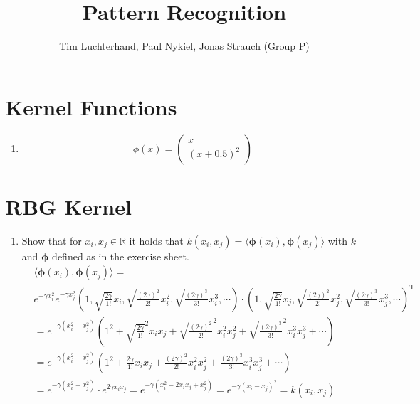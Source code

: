 \documentclass[DIN, pagenumber=false, fontsize=11pt, parskip=half]{scrartcl}
\title{Pattern Recognition}
\author{Tim Luchterhand, Paul Nykiel, Jonas Strauch (Group P)}
\newcommand{\R}[0]{\mathbb{R}}
\begin{document}
    \maketitle
    \section{Kernel Functions}
    \begin{enumerate}
        \item 
            \begin{equation*}
                \phi(x) = \begin{pmatrix} x \\ {(x + 0.5)}^2 \end{pmatrix}
            \end{equation*}
    \end{enumerate}
    \section{RBG Kernel}
    \begin{enumerate}
        \item
        Show that for $x_i, x_j \in \R$ it holds that $k(x_i, x_j) = \langle \bm{\phi}(x_i), \bm{\phi}(x_j) \rangle$
        with $k$ and $\bm{\phi}$ defined as in the exercise sheet.
        \begin{align*}
             &\langle \bm{\phi}(x_i), \bm{\phi}(x_j) \rangle = \\
             &e^{-\gamma x_i^2} e^{-\gamma x_j^2}
             \left( 1, \sqrt{\frac{2 \gamma}{1!}} x_i, \sqrt{\frac{(2 \gamma)^2}{2!}} x_i^2,
             \sqrt{\frac{(2 \gamma)^3}{3!}} x_i^3, \cdots \right) \cdot
             \left( 1, \sqrt{\frac{2 \gamma}{1!}} x_j, \sqrt{\frac{(2 \gamma)^2}{2!}} x_j^2,
             \sqrt{\frac{(2 \gamma)^3}{3!}} x_j^3, \cdots \right)^\text{T} \\
             &= e^{-\gamma (x_i^2 + x_j^2)} \left( 1^2 + \sqrt{\frac{2 \gamma}{1!}}^2 x_i x_j
             + \sqrt{\frac{(2 \gamma)^2}{2!}}^2 x_i^2 x_j^2 + \sqrt{\frac{(2 \gamma)^3}{3!}}^2
             x_i^3 x_j^3 + \cdots \right) \\
             &= e^{-\gamma (x_i^2 +  x_j^2)} \left( 1^2 + \frac{2 \gamma}{1!} x_i x_j
             + \frac{(2 \gamma)^2}{2!} x_i^2 x_j^2 + \frac{(2 \gamma)^3}{3!} x_i^3 x_j^3
             + \cdots \right) \\
             &= e^{-\gamma (x_i^2 +  x_j^2)} \cdot e^{2 \gamma x_i x_j}
             = e^{-\gamma (x_i^2 - 2 x_i x_j + x_j^2)} = e^{-\gamma (x_i - x_j)^2} = k(x_i, x_j)
        \end{align*}
    \end{enumerate}
\end{document}
